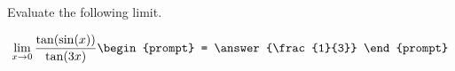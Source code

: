 \documentclass{ximera}
\author{Steven Gubkin}
\begin{document}
\begin{exercise}

Evaluate the following limit. %

\[
\lim_{x \to 0} \frac{\tan(\sin(x))}{\tan(3x)} \begin{prompt} = \answer{\frac{1}{3}} \end{prompt}
\]

\end{exercise}
\end{document}
